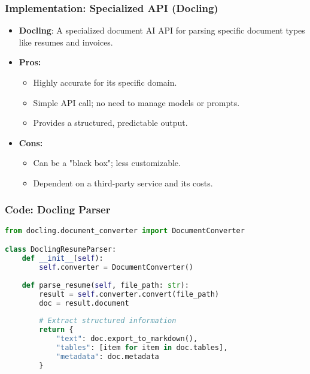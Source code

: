 \begin{frame}[fragile]\frametitle{Implementation: Specialized API (Docling)}
    \begin{itemize}
        \item \textbf{Docling}: A specialized document AI API for parsing specific document types like resumes and invoices.
        \item \textbf{Pros:}
        \begin{itemize}
            \item Highly accurate for its specific domain.
            \item Simple API call; no need to manage models or prompts.
            \item Provides a structured, predictable output.
        \end{itemize}
        \item \textbf{Cons:}
        \begin{itemize}
            \item Can be a "black box"; less customizable.
            \item Dependent on a third-party service and its costs.
        \end{itemize}
    \end{itemize}
\end{frame}

\begin{frame}[fragile]\frametitle{Code: Docling Parser}
    \begin{lstlisting}[language=Python, basicstyle=\tiny, caption={llm\_parsing\_docling.py}]
from docling.document_converter import DocumentConverter

class DoclingResumeParser:
    def __init__(self):
        self.converter = DocumentConverter()
    
    def parse_resume(self, file_path: str):
        result = self.converter.convert(file_path)
        doc = result.document
        
        # Extract structured information
        return {
            "text": doc.export_to_markdown(),
            "tables": [item for item in doc.tables],
            "metadata": doc.metadata
        }
    \end{lstlisting}
\end{frame}

